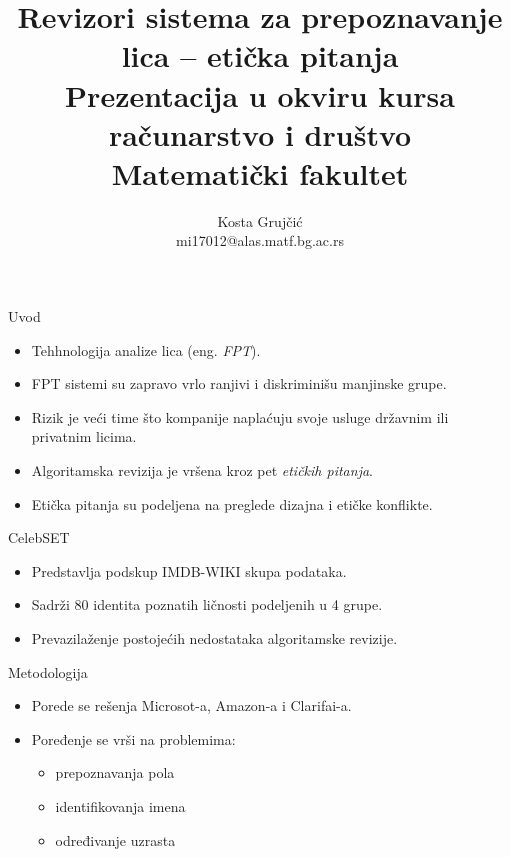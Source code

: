 \documentclass{beamer}
\title[]{Revizori sistema za prepoznavanje lica -- etička pitanja\\\small{Prezentacija u okviru kursa\\računarstvo i društvo\\Matematički fakultet}}
\author{Kosta Grujčić\\mi17012@alas.matf.bg.ac.rs}
\date{}
\begin{document}
	\begin{frame}
		\titlepage
	\end{frame}

	\begin{frame}{Uvod}
		\begin{itemize}
			\item Tehhnologija analize lica (eng. \textit{FPT}).
			\item FPT sistemi su zapravo vrlo ranjivi i diskriminišu manjinske grupe.
			\item Rizik je veći time što kompanije naplaćuju svoje usluge državnim ili privatnim licima.
		\end{itemize}
	\end{frame}

	\begin{frame}
		\begin{itemize}
			\item Algoritamska revizija je vršena kroz pet \textit{etičkih pitanja}.
			\item Etička pitanja su podeljena na preglede dizajna i etičke konflikte.
		\end{itemize}
	\end{frame}

	\begin{frame}{CelebSET}
		\begin{itemize}
			\item Predstavlja podskup IMDB-WIKI skupa podataka.
			\item Sadrži 80 identita poznatih ličnosti podeljenih u 4 grupe.
			\item Prevazilaženje postojećih nedostataka algoritamske revizije.
		\end{itemize}
	\end{frame}

	\begin{frame}{Metodologija}
		\begin{itemize}
			\item Porede se rešenja Microsot-a, Amazon-a i Clarifai-a.
			\item Poređenje se vrši na problemima:
			\begin{itemize}
				\item prepoznavanja pola
				\item identifikovanja imena
				\item određivanje uzrasta
			\end{itemize}
		\end{itemize}
	\end{frame}
\end{document}
